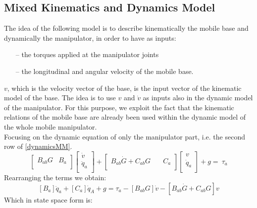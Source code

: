 \subsection{Mixed Kinematics and Dynamics Model}
The idea of the following model is to describe kinematically the mobile base and dynamically the manipulator, in order to have as inputs:
\begin{itemize}\itemsep1pt
	\item[--] the torques applied at the manipulator joints
	\item[--] the longitudinal and angular velocity of the mobile base.
\end{itemize}
$v$, which is the velocity vector of the base, is the input vector of the kinematic model of the base. The idea is to use $v$ and $\dot{v}$ as inputs also in the dynamic model of the manipulator. 
For this purpose, we exploit the fact that the kinematic relations of the mobile base are already been used within the dynamic model of the whole mobile manipulator. \\Focusing on the dynamic equation of only the manipulator part, i.e. the second row of \ref{dynamicsMM}.
\begin{equation}
	\left[\begin{matrix}B_{ab}G&B_a\\\end{matrix}\right]\left[\begin{matrix}\dot{v}\\\ddot{q}_a\\\end{matrix}\right]+\left[\begin{matrix}B_{ab}\dot{G}+C_{ab}G&\quad C_a\\\end{matrix}\right]\left[\begin{matrix}v\\\dot{q}_a\\\end{matrix}\right]+g=\ \tau_a
\end{equation}
Rearranging the terms we obtain:
\begin{equation}
	\left[B_a\right]\ddot{q}_a+\left[C_a\right]\dot{q}_A+g=\tau_a-\left[B_{ab}G\right]\dot{v}-\left[B_{ab}\dot{G}+C_{ab}G\right]v
\end{equation}
Which in state space form is:
